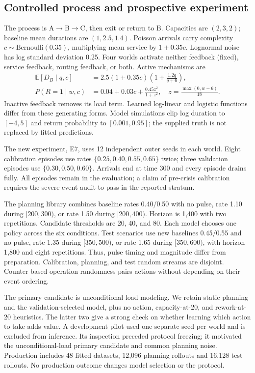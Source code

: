 \documentclass[runningheads]{llncs}
\begin{document}
\subsection{Controlled process and prospective experiment}
The process is A$\rightarrow$B$\rightarrow$C, then exit or return to B. Capacities are $(2,3,2)$; baseline mean durations are $(1,2.5,1.4)$. Poisson arrivals carry complexity $c\sim\mathrm{Bernoulli}(0.35)$, multiplying mean service by $1+0.35c$. Lognormal noise has log standard deviation 0.25. Four worlds activate neither feedback (fixed), service feedback, routing feedback, or both. Active mechanisms are
\begin{align}\label{eq:truth}
\mathbb E[D_B\mid q,c]&=2.5(1+0.35c)\left(1+\frac{1.2q}{q+6}\right),\\
P(R=1\mid w,c)&=0.04+0.03c+\frac{0.45z^2}{1+z^2},\quad z=\frac{\max(0,w-6)}{18}.
\end{align}
Inactive feedback removes its load term. Learned log-linear and logistic functions differ from these generating forms. Model simulations clip log duration to $[-4,5]$ and return probability to $[0.001,0.95]$; the supplied truth is not replaced by fitted predictions.

The new experiment, E7, uses 12 independent outer seeds in each world. Eight calibration episodes use rates $\{0.25,0.40,0.55,0.65\}$ twice; three validation episodes use $\{0.30,0.50,0.60\}$. Arrivals end at time 300 and every episode drains fully. All episodes remain in the evaluation; a claim of pre-crisis calibration requires the severe-event audit to pass in the reported stratum.

The planning library combines baseline rates 0.40/0.50 with no pulse, rate 1.10 during $[200,300)$, or rate 1.50 during $[200,400)$. Horizon is 1,400 with two repetitions. Candidate thresholds are 20, 40, and 80. Each model chooses one policy across the six conditions. Test scenarios use new baselines 0.45/0.55 and no pulse, rate 1.35 during $[350,500)$, or rate 1.65 during $[350,600)$, with horizon 1,800 and eight repetitions. Thus, pulse timing and magnitude differ from preparation. Calibration, planning, and test random streams are disjoint. Counter-based operation randomness pairs actions without depending on their event ordering.

The primary candidate is unconditional load modeling. We retain static planning and the validation-selected model, plus no action, capacity-at-20, and rework-at-20 heuristics. The latter two give a strong check on whether learning which action to take adds value. A development pilot used one separate seed per world and is excluded from inference. Its inspection preceded protocol freezing; it motivated the unconditional-load primary candidate and common planning noise. Production includes 48 fitted datasets, 12,096 planning rollouts and 16,128 test rollouts. No production outcome changes model selection or the protocol.
\end{document}
